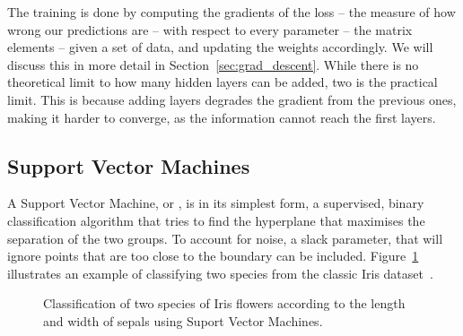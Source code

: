 The training is done by computing the gradients of the loss -- the measure of how wrong our predictions are -- with respect to every parameter -- the matrix elements -- given a set of data, and updating the weights accordingly.
We will discuss this in more detail in Section~\ref{sec:grad_descent}.
While there is no theoretical limit to how many hidden layers can be added, two is the practical limit.
This is because adding layers degrades the gradient from the previous ones, making it harder to converge, as the information cannot reach the first layers.


\subsection{Support Vector Machines}
A Support Vector Machine, or \SVM, is in its simplest form, a supervised, binary classification algorithm that tries to find the hyperplane that maximises the separation of the two groups.
To account for noise, a slack parameter, that will ignore points that are too close to the boundary can be included.
Figure~\ref{fig:svm} illustrates an example of classifying two species from the classic Iris dataset~\citep{iris_dataset}.


\begin{figure}
\centering
{}%
\hfil
{}%
\caption{Classification of two species of Iris flowers according to the length and width of sepals using Suport Vector Machines.}\label{fig:svm}
\end{figure}

